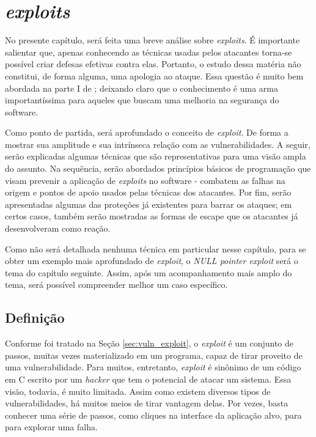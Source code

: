 
\chapter{\textsl{exploits}}
\label{chap:exploits}
	No presente capítulo, será feita uma breve análise sobre \textsl{exploits}.
	É importante salientar que, apenas conhecendo as técnicas usadas pelos atacantes
	torna-se possível criar defesas efetivas contra elas.
	Portanto, o estudo dessa matéria não constitui, de forma alguma, uma apologia
	ao ataque. Essa questão é muito bem abordada na parte I de \cite{Harris2008}; deixando
	claro que o conhecimento é uma arma importantíssima para aqueles que buscam
	uma melhoria na segurança do software.
	

	Como ponto de partida, será aprofundado o conceito de \textsl{exploit}. De forma
	a mostrar sua amplitude e sua intrínseca relação com as vulnerabilidades. A seguir,
	serão explicadas algumas técnicas que são representativas para uma visão ampla do assunto. 
	Na sequência, serão abordados princípios básicos de programação que visam prevenir a aplicação
	de \textsl{exploits} no software - combatem as falhas na origem e pontos de apoio usados
	pelas técnicas dos atacantes. Por fim, serão apresentadas algumas das proteções já existentes
	para barrar os ataques; em certos casos, também serão mostradas as formas de escape que
	os atacantes já desenvolveram como reação. 
	

	Como não será detalhada nenhuma técnica em particular nesse capítulo, para se obter um exemplo
	mais aprofundado de \textsl{exploit}, o \textsl{NULL pointer exploit} será o tema do capítulo seguinte.
	Assim, após um acompanhamento mais amplo do tema, será possível compreender melhor um caso específico.

	\section{Definição}
		Conforme foi tratado na Seção \ref{sec:vuln_exploit}, o \textsl{exploit} é um conjunto de passos,
		muitas vezes materializado em um programa, capaz de tirar proveito de uma vulnerabilidade.
		Para muitos, entretanto, \textsl{exploit} é sinônimo de um código em C escrito por um \textsl{hacker}
		que tem o potencial de atacar um sistema. Essa visão, todavia, é muito limitada.
		Assim como existem diversos tipos de vulnerabilidades, há muitos meios de tirar vantagem
		delas. Por vezes, basta conhecer uma série de passos, como cliques na interface
		da aplicação alvo, para para explorar uma falha.

